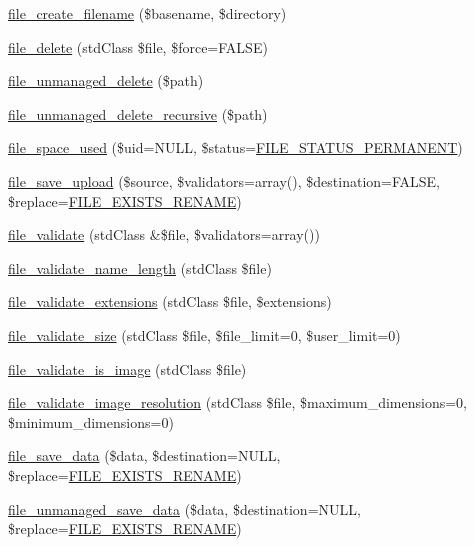 \begin{DoxyCompactItemize}
\hyperlink{group__file_ga057bbfa5f89c4e4c75f0030e6f1f3809}{file\_\-create\_\-filename} (\$basename, \$directory)
\item 
\hyperlink{group__file_gac7503f0dcdea965d68e4a242e7760921}{file\_\-delete} (stdClass \$file, \$force=FALSE)
\item 
\hyperlink{group__file_ga336a7e83da1397131e665d1c6e97fc83}{file\_\-unmanaged\_\-delete} (\$path)
\item 
\hyperlink{group__file_gaf5c2cffaaf70f0f62a513f033d814899}{file\_\-unmanaged\_\-delete\_\-recursive} (\$path)
\item 
\hyperlink{group__file_gade600fbda0056f4aaea634e7178215b2}{file\_\-space\_\-used} (\$uid=NULL, \$status=\hyperlink{group__file_gaf208a7c7d7fd09276233583b22e4ee32}{FILE\_\-STATUS\_\-PERMANENT})
\item 
\hyperlink{group__file_gaec0ce0fef696b3d4f9e0809c84bd8f41}{file\_\-save\_\-upload} (\$source, \$validators=array(), \$destination=FALSE, \$replace=\hyperlink{group__file_ga5d6636d4ccd022885823b91f17a0f464}{FILE\_\-EXISTS\_\-RENAME})
\item 
\hyperlink{group__file_ga9edf58fdc552d61247bbf8322c434abf}{file\_\-validate} (stdClass \&\$file, \$validators=array())
\item 
\hyperlink{group__file_gaca56a55a4d3ee635cddf38903c1ed367}{file\_\-validate\_\-name\_\-length} (stdClass \$file)
\item 
\hyperlink{group__file_ga4036c6b78f904e5dd0273cf75eb474bb}{file\_\-validate\_\-extensions} (stdClass \$file, \$extensions)
\item 
\hyperlink{group__file_gad5dc623436b94f82d7a110adf8590915}{file\_\-validate\_\-size} (stdClass \$file, \$file\_\-limit=0, \$user\_\-limit=0)
\item 
\hyperlink{group__file_ga4cf6d97afe1580b23a14d96fede02d01}{file\_\-validate\_\-is\_\-image} (stdClass \$file)
\item 
\hyperlink{group__file_gaa90145fbf8065f644871c9d770e3cce4}{file\_\-validate\_\-image\_\-resolution} (stdClass \$file, \$maximum\_\-dimensions=0, \$minimum\_\-dimensions=0)
\item 
\hyperlink{group__file_ga7a01611c7c08b91876d93431207dd9b0}{file\_\-save\_\-data} (\$data, \$destination=NULL, \$replace=\hyperlink{group__file_ga5d6636d4ccd022885823b91f17a0f464}{FILE\_\-EXISTS\_\-RENAME})
\item 
\hyperlink{group__file_gac2d047d4471ec93803f584cda01a557c}{file\_\-unmanaged\_\-save\_\-data} (\$data, \$destination=NULL, \$replace=\hyperlink{group__file_ga5d6636d4ccd022885823b91f17a0f464}{FILE\_\-EXISTS\_\-RENAME})

\end{DoxyCompactItemize}
